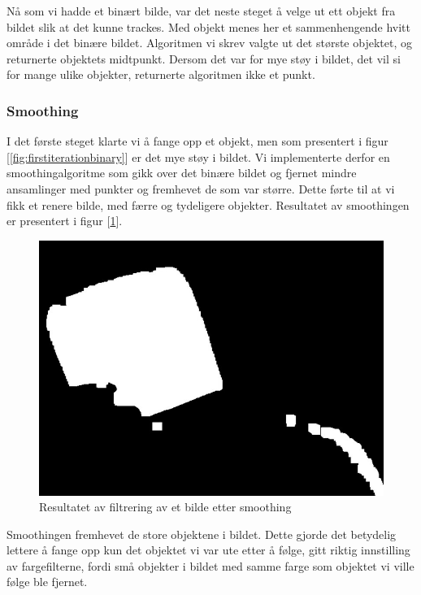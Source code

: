 Nå som vi hadde et binært bilde, var det neste steget å velge ut ett objekt fra bildet slik at det kunne trackes. Med objekt menes her et sammenhengende hvitt område i det binære bildet. Algoritmen vi skrev valgte ut det største objektet, og returnerte objektets midtpunkt. Dersom det var for mye støy i bildet, det vil si for mange ulike objekter, returnerte algoritmen ikke et punkt.

\subsubsection{Smoothing}

I det første steget klarte vi å fange opp et objekt, men som presentert i figur [\ref{fig:firstiterationbinary}] er det mye støy i bildet. Vi implementerte derfor en smoothingalgoritme som gikk over det binære bildet og fjernet mindre ansamlinger med punkter og fremhevet de som var større. Dette førte til at vi fikk et renere bilde, med færre og tydeligere objekter. Resultatet av smoothingen er presentert i figur [\ref{fig:seconditerationbinary}].

\begin{figure}[h!]
	\centering
	\includegraphics[scale=0.45]{img/second-binary.jpg}
	\caption[Andre iterasjon binært bilde]{Resultatet av filtrering av et bilde etter smoothing}
	\label{fig:seconditerationbinary}
\end{figure}

Smoothingen fremhevet de store objektene i bildet. Dette gjorde det betydelig lettere å fange opp kun det objektet vi var ute etter å følge, gitt riktig innstilling av fargefilterne, fordi små objekter i bildet med samme farge som objektet vi ville følge ble fjernet.

